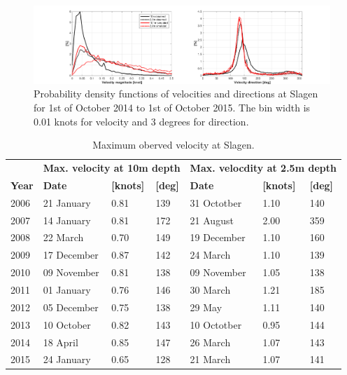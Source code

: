 \documentclass[12pt,a4paper,english]{article}
\begin{document}
\begin{figure}[t]
\centerline{
\includegraphics*[trim=3cm 0cm 3cm 0cm,clip=true,width=\textwidth]{Figurer/Slagen_pdf} 
}
\caption{\small
Probability density functions of velocities and directions at Slagen for 1st of October 2014 to 1st of October 2015. The bin width is 0.01 knots for velocity and 3 degrees for direction.}
\label{fig:Slagen-pdf}
\end{figure}

\begin{table}[ht]
\caption{Maximum oberved velocity at Slagen.}
\label{tab:Slagen_max}
\centering
\begin{tabular}{|l|lll|lll|}
\hline 
& \multicolumn{3}{|l|}{\bf Max. velocity at 10m depth} & \multicolumn{3}{|l|}{\bf Max. velocdity at 2.5m depth} \\
{\bf Year} & {\bf Date} & {\bf [knots]} & {\bf [deg]} & {\bf Date} & {\bf [knots]} & {\bf [deg]} \\ \hline 
\small 2006 & 21 January  & 0.81 & 139 & 31 Octotber & 1.10 & 140 \\
\small 2007 & 14 January  & 0.81 & 172 & 21 August   & 2.00 & 359 \\
\small 2008 & 22 March    & 0.70 & 149 & 19 December & 1.10 & 160 \\
\small 2009 & 17 December & 0.87 & 142 & 24 March    & 1.10 & 139 \\
\small 2010 & 09 November & 0.81 & 138 & 09 November & 1.05 & 138 \\
\small 2011 & 01 January  & 0.76 & 146 & 30 March    & 1.21 & 185 \\
\small 2012 & 05 December & 0.75 & 138 & 29 May      & 1.11 & 140 \\
\small 2013 & 10 October  & 0.82 & 143 & 10 Octotber & 0.95 & 144 \\
\small 2014 & 18 April    & 0.85 & 147 & 26 March    & 1.07 & 143 \\
\small 2015 & 24 January  & 0.65 & 128 & 21 March    & 1.07 & 141 \\
\hline
\end{tabular}
\end{table}
\end{document}

